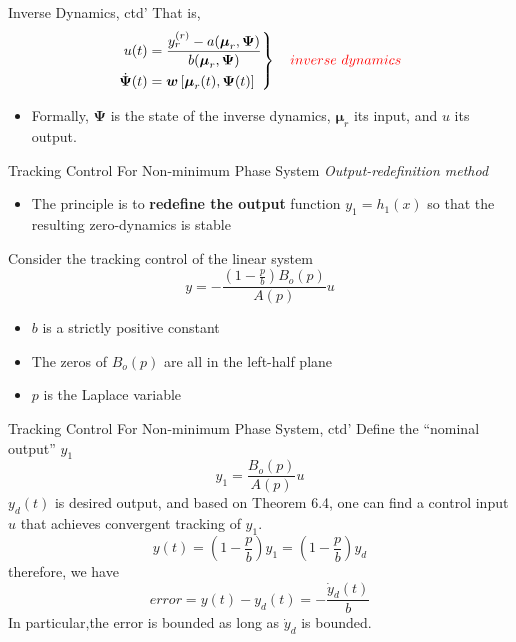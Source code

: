 \documentclass{beamer}
\renewcommand{\vec}[1]{\ensuremath{\boldsymbol{#1}}} %
\begin{document}
\begin{frame}{Inverse Dynamics, ctd'}
    That is,
    \begin{equation}\label{inverse-dynamics}
      \left. \begin{aligned}
        u(t) &= \frac{y_{r}^{(r)}-a(\vec{\mu}_{r}, \vec{\Psi})}{b(\vec{\mu}_{r}, \vec{\Psi})} \\
        \dot{\vec{\Psi}}(t) &= \vec{w}\left[ \vec{\mu}_{r}(t),\vec{\Psi}(t) \right]
      \end{aligned} \right\} \quad {\color{red}inverse ~dynamics}
    \end{equation}
    \begin{itemize}
      \item Formally, $\vec{\Psi}$ is the state of the inverse dynamics, $\vec{\mu}_{r}$ its input, and $u$ its output.
    \end{itemize}
\end{frame}


\begin{frame}{Tracking Control For Non-minimum Phase System}
    \textit{\color{red}\large{Output-redefinition method}}
    \begin{itemize}
      \item The principle is to \textbf{redefine the output} function $y_{1}=h_{1}(x)$ so that the resulting zero-dynamics is stable
    \end{itemize}
    Consider the tracking control of the linear system
    \begin{equation}
        y=-\frac{\left(1-\frac{p}{b}\right) B_{o}(p)}{A(p)}u
    \end{equation}
    \begin{itemize}
      \item $b$ is a strictly positive constant
      \item The zeros of $B_{o}(p)$ are all in the left-half plane
      \item $p$ is the Laplace variable
    \end{itemize}
\end{frame}

\begin{frame}{Tracking Control For Non-minimum Phase System, ctd'}
    Define the {\color{red}``nominal output'' $y_{1}$}
    \begin{equation}\label{y1}
      y_{1}=\frac{B_{o}(p)}{A(p)}u
    \end{equation}
    $y_{d}(t)$ is desired output, and based on Theorem 6.4, one can find a control input $u$ that achieves {\color{red}convergent tracking of $y_{1}$}.
    \begin{equation}
        y(t)=\left(1-\frac{p}{b}\right) y_{1}=\left(1-\frac{p}{b}\right) y_{d}
    \end{equation}
    therefore, we have
    $$
        error = y(t)-y_{d}(t)=-\frac{\dot{y}_{d}(t)}{b}
    $$
    In particular,the error is {\color{red}bounded} as long as $\dot{y}_{d}$ is bounded.
\end{frame}
\end{document}
